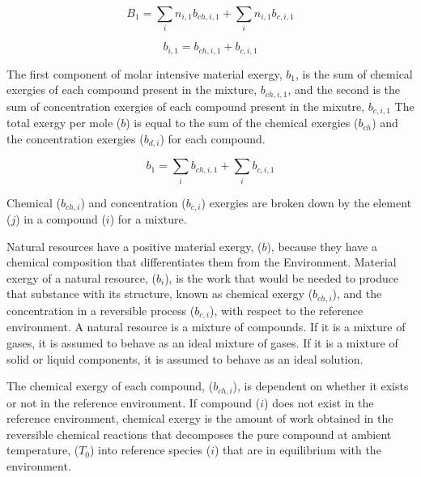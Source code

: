 \documentclass[energies,article,submit,pdftex,moreauthors]{Definitions/mdpi}
\begin{document}
\begin{equation}\label{eq:specific_exergy_definition}
  B_{1} = \sum_{i}{n_{i,1}b_{ch,i,1}} + \sum_{i}{n_{i,1}b_{c,i,1}}
\end{equation}

\begin{equation}\label{eq:simplified_material_exergy_definition}
  b_{i,1} = b_{ch,i,1} + b_{c,i,1}
\end{equation}


The first component of molar intensive material exergy, $b_{1}$,
is the sum of chemical exergies of each compound
present in the mixture, $b_{ch,i,1}$,
and the second is the sum of concentration exergies of each compound
present in the mixutre, $b_{c,i,1}$
The total exergy per mole ($b$) is equal to the sum of the chemical exergies ($b_{ch}$)
and the concentration exergies ($b_{d,i}$) for each compound.

\begin{equation}\label{eq:specific_molar_intensive_exergy_definition}
  b_{1} = \sum_{i}{b_{ch,i,1}} + \sum_{i}{b_{c,i,1}}
\end{equation}

Chemical ($b_{ch,i}$) and concentration ($b_{c,i}$) exergies are broken down
by the element ($j$) in a compound ($i$)
for a mixture.

Natural resources have a positive material exergy, ($b$),
because they have a chemical composition
that differentiates them from the Environment.
Material exergy of a natural resource, ($b_{i}$),
is the work that would be needed
to produce that substance with its structure,
known as chemical exergy ($b_{ch,i}$),
and the concentration in a reversible process ($b_{c,i}$),
with respect to the reference environment.
A natural resource is a mixture of compounds.
If it is a mixture of gases,
it is assumed to behave as an ideal mixture of gases.
If it is a mixture of solid or liquid components,
it is assumed to behave as an ideal solution.

The chemical exergy of each compound, ($b_{ch,i}$), is dependent
on whether it exists or not
in the reference environment.
If compound ($i$) does not exist
in the reference environment,
chemical exergy is the amount of work obtained
in the reversible chemical reactions
that decomposes the pure compound at ambient temperature, ($T_{0}$)
into reference species ($i$) that are in equilibrium
with the environment.
\end{document}
